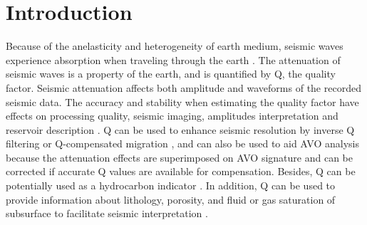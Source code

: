 \section{Introduction}
Because of the anelasticity and heterogeneity of earth medium, seismic waves experience absorption when traveling through the earth \cite[]{ricker1953,futterman1962,wright1981,kneib1995,changjun2002,yanghua2002,patro2006,youyi2010,youyi2012,shuwei2016vscan,yufeng2018geo}. The attenuation of seismic waves is a property of the earth, and is quantified by Q, the quality factor. Seismic attenuation affects both amplitude and waveforms of the recorded seismic data. The accuracy and stability when estimating the quality factor have effects on processing quality, seismic imaging, amplitudes interpretation and reservoir description \cite[]{guorui2014,yufeng2018l12}. 
Q can be used to enhance seismic resolution by inverse Q filtering or Q-compensated migration \cite[]{Kjartansson1979Constant,Carcione2002Time,toverud2005comparison,carcione2007wave,zhang2007seismic,wang2011attenuation,prudencio2013spatial,delle2014frequency,dutta2014attenuation,zhu2014time,li2015efficient,matsushima2015seismic,wang2015q,tieyuan2015Implementation,zhu2017viscoelastic,jingnan2018}, and can also be used to aid AVO analysis because the attenuation effects are superimposed on AVO signature and can be corrected if accurate Q values are available for compensation. Besides, Q can be potentially used as a hydrocarbon indicator \cite[]{hedlin2001,yanghua2004,yanghua2014}. In addition, Q can be used to provide information about lithology, porosity, and fluid or gas saturation of subsurface to facilitate seismic interpretation \cite[]{pengcheng2012}. 

